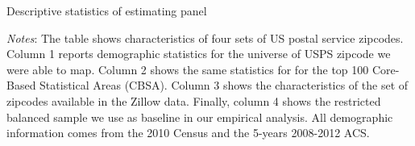 \begin{table}[h!]
	\caption{Descriptive statistics of estimating panel}
	\centering
	\label{tab:estimating_panel_stats}    
	
	\begin{minipage}{0.95\textwidth} \footnotesize
		\vspace{3mm} 
		\textit{Notes}: The table shows characteristics of four sets of US postal service zipcodes.
		Column 1 reports demographic statistics for the universe of USPS zipcode we were able to 
		map. Column 2 shows the same statistics for for the top 100 Core-Based Statistical Areas 
		(CBSA). Column 3 shows the characteristics of the set of zipcodes available in the Zillow 
		data. Finally, column 4 shows the restricted balanced sample we use as baseline in our 
		empirical analysis. All demographic information comes from the 2010 Census and the 5-years 
		2008-2012 ACS.
	\end{minipage}
\end{table}

